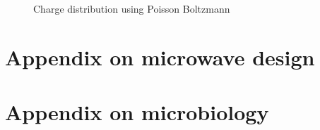 \documentclass[fleqn,10pt]{article}
\begin{document}
\begin{figure}[H]
	\captionsetup{singlelinecheck = false, justification=justified}
	\centering
	
	\caption{Charge distribution using Poisson Boltzmann}
\end{figure}




\clearpage




\clearpage

%



%























\section{Appendix on microwave design}





\section{Appendix on microbiology}















\printbibliography[title={All references}]
\end{document}
